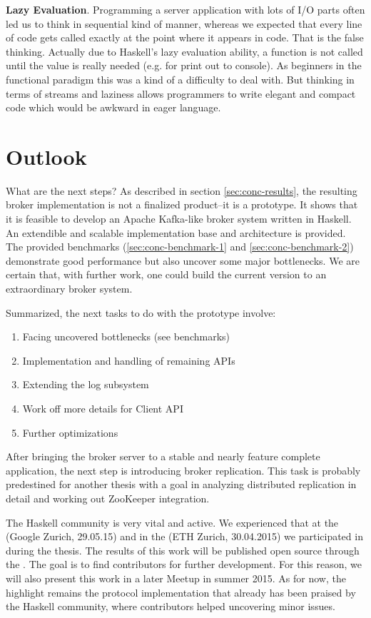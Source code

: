 {\bf Lazy Evaluation}. Programming a server application with lots of I/O parts
often led us to think in sequential kind of manner, whereas we expected that
every line of code gets called exactly at the point where it appears in code.
That is the false thinking.  Actually due to Haskell's lazy evaluation ability,
a function is not called until the value is really needed (e.g. for print out
to console). As beginners in the functional paradigm this was a kind of a
difficulty to deal with. But thinking in terms of streams and laziness allows
programmers to write elegant and compact code which would be awkward in eager
language.





\newpage
\section{Outlook}

What are the next steps? As described in section \ref{sec:conc-results}, the
resulting broker implementation is not a finalized product--it is a prototype.
It shows that it is feasible to develop an Apache Kafka-like broker system
written in Haskell. An extendible and scalable implementation base and
architecture is provided. The provided benchmarks (\ref{sec:conc-benchmark-1}
and \ref{sec:conc-benchmark-2}) demonstrate good performance but also uncover
some major bottlenecks. We are certain that, with further work, one could build
the current version to an extraordinary broker system.

Summarized, the next tasks to do with the prototype involve:
\begin{enumerate}
    \item Facing uncovered bottlenecks (see benchmarks)
    \item Implementation and handling of remaining APIs
    \item Extending the log subsystem
    \item Work off more details for Client API
    \item Further optimizations
\end{enumerate}

After bringing the broker server to a stable and nearly feature complete
application, the next step is introducing broker replication. This task
is probably predestined for another thesis with a goal in analyzing
distributed replication in detail and working out ZooKeeper
integration.

The Haskell community is very vital and active. We experienced that at the
 (Google Zurich,
29.05.15) and in the 
(ETH Zurich, 30.04.2015) we participated in during the thesis. The results
of this work will be published open source through the . The goal is to find contributors for
further development. For this reason, we will also present this work in a
later Meetup in summer 2015. As for now, the highlight remains the
protocol implementation that already has been praised by the Haskell community, where
contributors helped uncovering minor issues.

